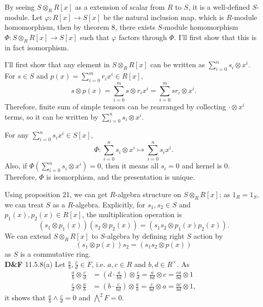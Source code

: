 \documentclass[a4paper, 12pt]{article}
\theoremstyle{Mydefinition}
\theoremstyle{Mytheorem}
\begin{document}
By seeing $S\otimes_R R[x]$ as a extension of scalar from $R$ to $S$, it is a well-defined $S$-module. Let $\varphi:R[x]\rightarrow S[x]$ be the natural inclusion map, which is $R$-module homomorphism, then by theorem 8, there exists $S$-module homomorphism $\Phi: S\otimes_R R[x]\rightarrow S[x]$ such that $\varphi$ factors through $\Phi$. I'll first show that this is in fact isomorphism.

I'll first show that any element in $S\otimes_R R[x]$ can be written as $\sum_{i=0}^n s_i\otimes x^i$. For $s\in S$ and $p(x) = \sum_{i=0}^m r_ix^i\in R[x]$,
\begin{equation}
    s\otimes p(x) = \sum_{i=0}^m s\otimes r_i x^i = \sum_{i=0}^m sr_i\otimes x^i.
\end{equation}
Therefore, finite sum of simple tensors can be rearranged by collecting $\cdot \otimes x^i$ terms, so it can be written by $\sum_{i=0}^n s_i\otimes x^i$.

For any $\sum_{i=0}^n s_ix^i\in S[x]$,
\begin{equation}
    \Phi:\sum_{i=0}^n s_i\otimes x^i\mapsto \sum_{i=0}^n s_ix^i.
\end{equation}
Also, if $\Phi\left(\sum_{i=0}^n s_i\otimes x^i\right) = 0$, then it means all $s_i=0$ and kernel is $0$. Therefore, $\Phi$ is isomorphism, and the presentation is unique.

Using proposition 21, we can get $R$-algebra structure on $S\otimes_R R[x]$; as $1_R=1_S$, we can treat $S$ as a $R$-algebra. Explicitly, for $s_1,s_2\in S$ and $p_1(x),p_2(x)\in R[x]$, the multiplication operation is
\begin{equation}
       (s_1\otimes p_1(x))(s_2\otimes p_2(x)) = (s_1s_2\otimes p_1(x)p_2(x)).
\end{equation}
We can extend $S\otimes_R R[x]$ to $S$-algebra by defining right $S$ action by
\begin{equation}
    (s_1\otimes p(x))s_2 = (s_1s_2\otimes p(x))
\end{equation}
as $S$ is a commutative ring.\\

\noindent \textbf{D\&F} 11.5.8(a)
Let $\frac{a}{b},\frac{c}{d}\in F$, i.e. $a,c\in R$ and $b,d\in R^\times$. As
\begin{equation}
    \begin{split}
        \frac{a}{b}\otimes \frac{c}{d} &= \left(d\cdot \frac{a}{bd}\right)\otimes\frac{c}{d} =\frac{a}{bd} \otimes c = \frac{ca}{bd}\otimes 1\\
        \frac{c}{d}\otimes \frac{a}{b} &= \left(b\cdot \frac{c}{bd}\right)\otimes\frac{a}{b} =\frac{c}{bd} \otimes a = \frac{ac}{bd}\otimes 1,
    \end{split}
\end{equation}
it shows that $\frac{a}{b}\wedge \frac{c}{d} = 0$ and $\bigwedge^2 F = 0$.\\
\end{document}
